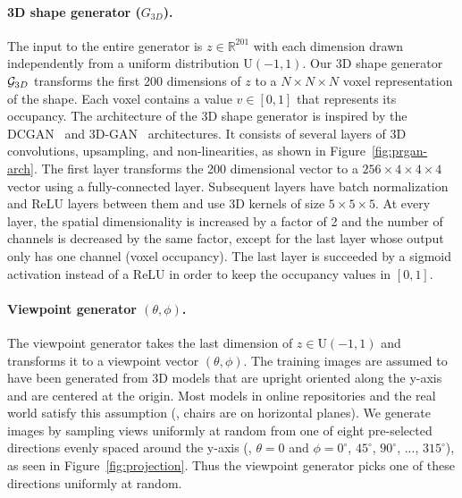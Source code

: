 \paragraph*{3D shape generator ($G_{3D}$).}
The input to the entire generator is $z \in \mathbb{R}^{201}$ with
each dimension drawn independently from a uniform distribution
$\text{U}(-1,1)$.
Our 3D shape generator ${\cal G}_{3D}$ transforms the first 200 dimensions of $z$ to a
$N\times N \times N$ voxel representation of the shape.
Each voxel contains a value $v\in[0, 1]$ that represents its occupancy.
The architecture of the 3D shape generator is inspired by the
DCGAN~\cite{radford2015unsupervised} and 3D-GAN~\cite{wu2016learning}
architectures. 
It consists of several layers of 3D convolutions, upsampling, and
non-linearities, as shown in Figure~\ref{fig:prgan-arch}.
The first layer transforms the 200 dimensional vector to a $256\times
4 \times 4 \times 4$ vector using a fully-connected layer.
Subsequent layers have batch normalization and ReLU layers between them
and use 3D kernels of size $5\times5\times5$.
At every layer, the spatial dimensionality is increased by a factor of 2 and
the number of channels is decreased by the same factor, except for the last layer whose
output only has one channel (voxel occupancy).
The last layer is succeeded by a sigmoid activation instead of a ReLU in order
to keep the occupancy values in $[0,1]$.

\paragraph*{Viewpoint generator $(\theta,\phi)$.}
The viewpoint generator takes the last dimension of $z \in
\text{U}(-1,1)$ and transforms it to a viewpoint vector
$(\theta,\phi)$.
The training images are assumed to have been generated from 3D models
that are upright oriented along the y-axis and are centered at the
origin.
Most models in online repositories and the real world satisfy this
assumption (\eg, chairs are on horizontal planes).
We generate images by sampling views uniformly at random from one of
eight pre-selected directions evenly spaced around the y-axis (\ie,
$\theta=0$ and $\phi=0^\circ$, $45^\circ$, $90^\circ$, $...$, $315^\circ$), as seen
in Figure~\ref{fig:projection}.
Thus the viewpoint generator picks one of these directions uniformly
at random.


